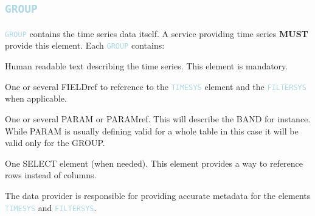 \documentclass[11pt,a4paper]{ivoa}
\newcommand\elem[1]{\textcolor{LightBlue}{{\tt#1}}}
\begin{document}
\subsection{\elem{GROUP}}
\elem{GROUP} contains the time series data itself. A service providing time series \textbf{MUST} provide this element. 
Each \elem{GROUP} contains:
\begin{description}
     \item[\elem{DESCRIPTION}] Human readable text describing the time series. This element is mandatory. 
     \item[\elem{FIELDref}] One or several FIELDref to reference to the \elem{TIMESYS} element and the \elem{FILTERSYS} when applicable. 
     \item One or several PARAM or PARAMref. This will describe the BAND for instance. While PARAM is usually defining valid for a whole table in this case it will be valid only for the GROUP.  
     \item One SELECT element (when needed). This element provides a way to reference rows instead of columns. 
\end{description}

The data provider is responsible for providing accurate metadata for the elements \elem{TIMESYS} and \elem{FILTERSYS}. 

\end{document}
